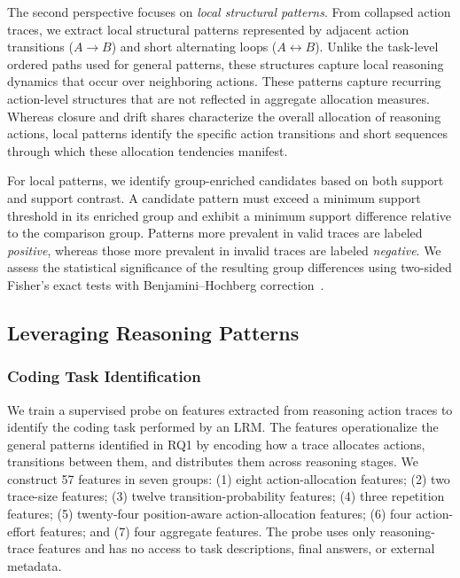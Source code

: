 \documentclass[acmsmall,screen,review,anonymous]{acmart}
\begin{document}
The second perspective focuses on \emph{local structural patterns}. From collapsed action traces, we extract local structural patterns represented by adjacent action transitions (\(A\rightarrow B\)) and short alternating loops (\(A\leftrightarrow B\)). Unlike the task-level ordered paths used for general patterns, these structures capture local reasoning dynamics that occur over neighboring actions. These patterns capture recurring action-level structures that are not reflected in aggregate allocation measures. Whereas closure and drift shares characterize the overall allocation of reasoning actions, local patterns identify the specific action transitions and short sequences through which these allocation tendencies manifest.

For local patterns, we identify group-enriched candidates based on both support and support contrast. A candidate pattern must exceed a minimum support threshold in its enriched group and exhibit a minimum support difference relative to the comparison group. Patterns more prevalent in valid traces are labeled \emph{positive}, whereas those more prevalent in invalid traces are labeled \emph{negative}. We assess the statistical significance of the resulting group differences using two-sided Fisher's exact tests with Benjamini--Hochberg correction~\cite{benjamini1995fdr}.


\subsection{Leveraging Reasoning Patterns}
\label{sec:pattern-applications}

\subsubsection{\textbf{Coding Task Identification}}
We train a supervised probe on features extracted from reasoning action traces to identify the coding task performed by an LRM. The features operationalize the general patterns identified in RQ1 by encoding how a trace allocates actions, transitions between them, and distributes them across reasoning stages.
We construct 57 features in seven groups: (1) eight action-allocation features; (2) two trace-size features; (3) twelve transition-probability features; (4) three repetition features; (5) twenty-four position-aware action-allocation features; (6) four action-effort features; and (7) four aggregate features. The probe uses only reasoning-trace features and has no access to task descriptions, final answers, or external metadata.
\end{document}
